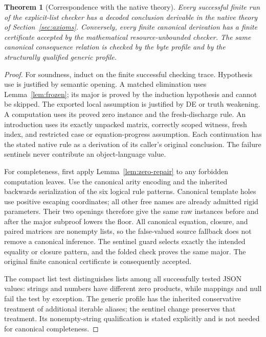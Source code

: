 \documentclass[11pt,letterpaper]{article}
\newtheorem{theorem}{Theorem}[section]
\theoremstyle{definition}\newtheorem{definition}[theorem]{Definition}
\theoremstyle{remark}\newtheorem{remark}[theorem]{Remark}
\begin{document}
\begin{theorem}[Correspondence with the native theory]
\label{thm:correspondence}
Every successful finite run of the explicit-list checker has a decoded
conclusion derivable in the native theory of Section~\ref{sec:axioms}.
Conversely, every finite canonical derivation has a finite certificate
accepted by the mathematical resource-unbounded checker. The same
canonical consequence relation is checked by the byte profile and by
the structurally qualified generic profile.
\end{theorem}
\begin{proof}
For soundness, induct on the finite successful checking trace.
Hypothesis use is justified by semantic opening. A matched elimination
uses Lemma~\ref{lem:frozen}; its major is proved by the induction
hypothesis and cannot be skipped. The exported local assumption is
justified by DE or truth weakening. A computation uses its proved zero
instance and the fresh-discharge rule. An introduction uses its exactly
unpacked matrix, correctly scoped witness, fresh index, and restricted
case or equation-progress assumption. Each continuation has the stated
native rule as a derivation of its caller's original conclusion.
The failure sentinels never contribute an object-language value.

For completeness, first apply Lemma~\ref{lem:zero-repair} to any forbidden
computation leaves. Use the canonical arity encoding and the inherited
backwards serialization of the six logical rule patterns. Canonical
template holes use positive escaping coordinates; all other free names
are already admitted rigid parameters. Their two openings therefore
give the same raw instances before and after the major subproof lowers
the floor. All canonical equation, closure, and paired matrices are
nonempty lists, so the false-valued source fallback does not remove a
canonical inference. The sentinel guard selects exactly the intended
equality or closure pattern, and the folded check proves the same major.
The original finite canonical certificate is consequently accepted.

The compact list test distinguishes lists among all successfully tested
JSON values: strings and numbers have different zero products, while
mappings and null fail the test by exception. The generic profile has
the inherited conservative treatment of additional iterable aliases;
the sentinel change preserves that treatment. Its nonempty-string
qualification is stated explicitly and is not needed for canonical
completeness.
\end{proof}
\end{document}
